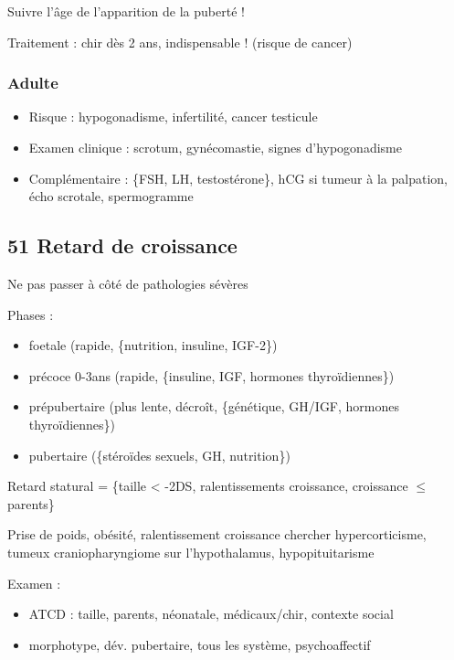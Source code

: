 \documentclass[11pt]{article}
\begin{document}
Suivre l'âge de l'apparition de la puberté !

Traitement : chir dès 2 ans, indispensable ! (risque de cancer)
\subsubsection{Adulte}
\label{sec:orge558f09}
\begin{itemize}
\item Risque : hypogonadisme, infertilité, cancer testicule
\item Examen clinique : scrotum, gynécomastie, signes d'hypogonadisme
\item Complémentaire : \{FSH, LH, testostérone\}, hCG si tumeur à la palpation, écho
scrotale, spermogramme
\end{itemize}
\subsection{51 \textdagger{} Retard de croissance}
\label{sec:orge818807}
\danger Ne pas passer à côté de pathologies sévères

Phases : 
\begin{itemize}
\item foetale (rapide, \{nutrition, insuline, IGF-2\})
\item précoce 0-3ans (rapide, \{insuline, IGF, hormones thyroïdiennes\})
\item prépubertaire (plus lente, décroît, \{génétique, GH/IGF, hormones thyroïdiennes\})
\item pubertaire (\{stéroïdes sexuels, GH, nutrition\})
\end{itemize}

Retard statural = \{taille < -2DS, ralentissements croissance, croissance \(\le\) parents\}

Prise de poids, obésité, ralentissement croissance \thus chercher
hypercorticisme, tumeux craniopharyngiome sur l'hypothalamus, hypopituitarisme

Examen :
\begin{itemize}
\item ATCD : taille, parents, néonatale, médicaux/chir, contexte social
\item morphotype, dév. pubertaire, tous les système, psychoaffectif
\end{itemize}
\end{document}
